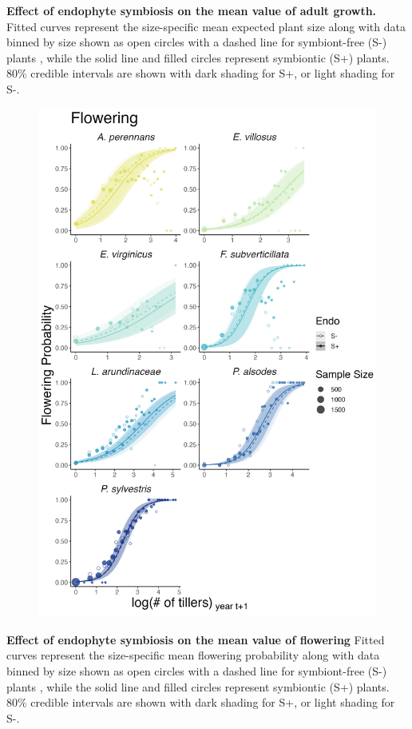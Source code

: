 \documentclass[12pt]{article}
\begin{document}
 \textbf{Effect of endophyte symbiosis on the mean value of adult growth.} Fitted curves represent the size-specific mean expected plant size along with data binned by size shown as open circles with a dashed line for symbiont-free (S-) plants , while the solid line and filled circles represent symbiontic (S+) plants. 80\% credible intervals are shown with dark shading for  S+, or light shading for S-.
\newpage

\begin{figure}[H]
	\centering
	\includegraphics[width=.6\linewidth]{flw_meanplot.png}
\end{figure}
 \textbf{Effect of endophyte symbiosis on the mean value of flowering} Fitted curves represent the size-specific mean flowering probability along with data binned by size shown as open circles with a dashed line for symbiont-free (S-) plants , while the solid line and filled circles represent symbiontic (S+) plants. 80\% credible intervals are shown with dark shading for  S+, or light shading for S-.
\end{document}
